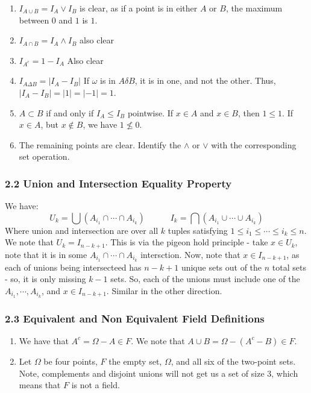 \documentclass[12pt,a4paper]{article}
\newcommand{\1}[1]{\mathbbm{1}\left\{ #1 \right\}}
\begin{document}
\begin{enumerate}
\item $I_{A \cup B} = I_A \vee I_B$ is clear, as if a point is in either $A$ or $B$, the maximum between $0$ and $1$ is $1$.

\item $I_{A \cap B} = I_A \wedge I_B$ also clear

\item $I_{A^c} = 1 - I_A$ Also clear

\item $I_{A \Delta B} = |I_A - I_B|$ If $\omega$ is in $A \delta B$, it is in one, and not the other. Thus, $|I_A - I_B| = |1| = |-1| = 1$. 

\item $A \subset B$ if and only if $I_A \leq I_B$ pointwise. If $x \in A$ and $x \in B$, then $1 \leq 1$. If $x \in A$, but $x \not \in B$, we have $1 \not\leq 0$. 

\item The remaining points are clear. Identify the $\wedge$ or $\vee$ with the corresponding set operation.

\end{enumerate}

\subsubsection{2.2 Union and Intersection Equality Property} We have:
$$
	U_k = \bigcup (A_{i_1} \cap \cdots \cap A_{i_k})
	\quad\quad\quad
	I_k = \bigcap (A_{i_1} \cup \cdots \cup A_{i_k})
$$
Where union and intersection are over all $k$ tuples satisfying $1 \leq i_1 \leq \cdots \leq i_k \leq n$. We note that $U_k = I_{n-k+1}$. This is via the pigeon hold principle - take $x \in U_k$, note that it is in some $A_{i_1} \cap \cdots \cap A_{i_k}$ intersction. Now, note that $x \in I_{n-k+1}$, as each of unions being intersecteed has $n - k + 1$ unique sets out of the $n$ total sets - so, it is only missing $k - 1$ sets. So, each of the unions must include one of the $A_{i_1}, \cdots, A_{i_k}$, and $x \in I_{n - k + 1}$. Similar in the other direction.

\subsubsection{2.3 Equivalent and Non Equivalent Field Definitions} 
\begin{enumerate}
\item We have that $A^c = \Omega - A \in F$. We note that $A \cup B = \Omega - (A^c - B) \in F$.

\item Let $\Omega$ be four points, $F$ the empty set, $\Omega$, and all six of the two-point sets. Note, complements and disjoint unions will not get us a set of size 3, which means that $F$ is not a field.
\end{enumerate}
\end{document}
